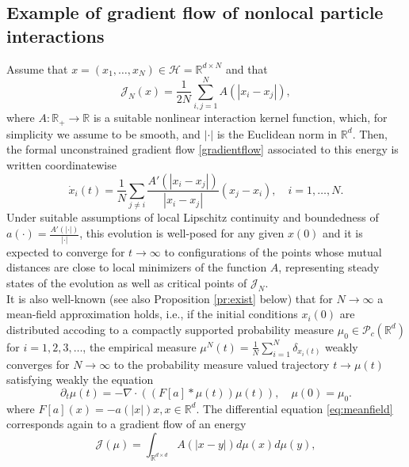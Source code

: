 \documentclass[A4paper,11pt]{article}
\theoremstyle{definition}
\begin{document}
\subsection{Example of gradient flow of nonlocal particle interactions}\label{sec:gradflow}

Assume that $x=(x_1,\dots,x_N) \in \mathcal H= \mathbb R^{d\times N}$ and that 
$$
\mathcal J_N(x) = \frac{1}{2N} \sum_{i,j=1}^N A(| x_i -  x_j |),
$$
where $A:\mathbb R_+ \to \mathbb R$ is a suitable nonlinear interaction kernel function, which, for simplicity we assume to be smooth, and $|\cdot|$ is the Euclidean norm in $\mathbb R^d$. Then, the formal unconstrained gradient flow \eqref{gradientflow} associated to this energy is written coordinatewise
\begin{equation}\label{fdgradientflow}
\dot x_i(t) = \frac{1}{N} \sum_{j \neq i} \frac{A'(| x_i -  x_j |)}{| x_i -  x_j |} (x_j - x_i), \quad i=1,\dots,N.
\end{equation}
Under suitable assumptions of local Lipschitz continuity and boundedness of $a(\cdot) = \frac{A'(|\cdot|)}{| \cdot |}$, this evolution is well-posed for any given $x(0)$ and it is expected to converge for $t \to \infty$ to configurations of the points whose mutual distances are close to local minimizers of the function $A$, representing steady states of the evolution as well as critical points of $\mathcal J_N$.\\
It is also well-known \cite{AGS} (see also Proposition \ref{pr:exist} below) that for $N \to \infty$ a mean-field approximation holds, i.e., if the initial conditions $x_i(0)$ are distributed accoding to a compactly supported probability measure $\mu_0 \in \mathcal P_c(\mathbb R^d)$ for $i=1,2,3, \dots$, the empirical measure $\mu^N(t) = \frac{1}{N} \sum_{i=1}^N \delta_{x_i(t)}$ weakly converges for $N \to \infty$  to the probability measure valued trajectory $t \to \mu(t)$ satisfying weakly the equation
\begin{equation}\label{eq:meanfield}
\partial_t \mu(t) = - \nabla \cdot ((F[a] * \mu(t)) \mu(t)), \quad \mu(0)=\mu_0.
\end{equation}
where $F[a](x) =-a(| x |)x, x \in \mathbb R^{d}$. The differential equation \eqref{eq:meanfield} corresponds again to a gradient flow of an energy
$$
\mathcal J (\mu) = \int_{\mathbb R^{d\times d}} A(| x-  y |) d \mu(x) d\mu(y),
$$
\end{document}
